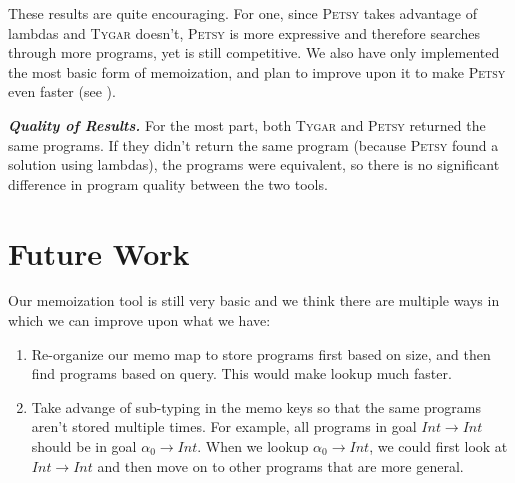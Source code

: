 \documentclass[acmsmall,nonacm]{acmart}
\begin{document}
These results are quite encouraging. For one, since \textsc{Petsy} takes advantage of 
lambdas and \textsc{Tygar} doesn't, \textsc{Petsy} is more expressive and therefore searches through 
more programs, yet is still competitive. We also have only implemented the most
basic form of memoization, and plan to improve upon it to make \textsc{Petsy} even
faster (see ).

\vspace{2mm}
\noindent \textbf{\textit{Quality of Results.}} For the most part, both \textsc{Tygar} 
and \textsc{Petsy} returned the same programs. If they didn't return the same program
(because \textsc{Petsy} found a solution using lambdas),
the programs were equivalent, so there is no significant difference in program quality between the two tools.

\section{Future Work}
\label{future}

Our memoization tool is still very basic and we think there are multiple ways in
which we can improve upon what we have:

\begin{enumerate}
  \item Re-organize our memo map to store programs first based on size, and then 
        find programs based on query. This would make lookup much faster.
  \item Take advange of sub-typing in the memo keys so that the same programs
        aren't stored multiple times. For example, all programs in goal 
        $Int \to Int$ should be in goal $\alpha_0 \to Int$. When
        we lookup $\alpha_0 \to Int$, we could first look at $Int \to Int$
        and then move on to other programs that are more general.
\end{enumerate}


 
\end{document}
